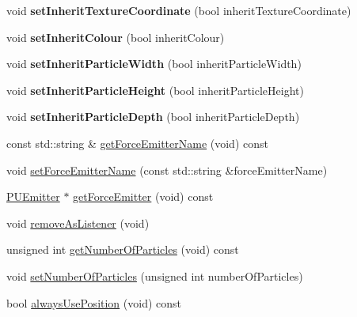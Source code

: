\begin{DoxyCompactItemize}
void {\bfseries set\+Inherit\+Texture\+Coordinate} (bool inherit\+Texture\+Coordinate)
\item 
\mbox{\label{classPUDoPlacementParticleEventHandler_a5a0e89b2e9f97be2961ca18541b1851e}} 
void {\bfseries set\+Inherit\+Colour} (bool inherit\+Colour)
\item 
\mbox{\label{classPUDoPlacementParticleEventHandler_a9ed7bb59f48aaf78fc12ee3a7077d3ee}} 
void {\bfseries set\+Inherit\+Particle\+Width} (bool inherit\+Particle\+Width)
\item 
\mbox{\label{classPUDoPlacementParticleEventHandler_a831eb45f0fd70ea5ec3fd5c255f9be76}} 
void {\bfseries set\+Inherit\+Particle\+Height} (bool inherit\+Particle\+Height)
\item 
\mbox{\label{classPUDoPlacementParticleEventHandler_adc98246958c411e27051834f67be777d}} 
void {\bfseries set\+Inherit\+Particle\+Depth} (bool inherit\+Particle\+Depth)
\item 
const std\+::string \& \hyperlink{classPUDoPlacementParticleEventHandler_ab56e12fe41572adc447449f72a87b774}{get\+Force\+Emitter\+Name} (void) const
\item 
void \hyperlink{classPUDoPlacementParticleEventHandler_a3f2f070e0ebaeb4f15f8f8f9bf4c8237}{set\+Force\+Emitter\+Name} (const std\+::string \&force\+Emitter\+Name)
\item 
\hyperlink{classPUEmitter}{P\+U\+Emitter} $\ast$ \hyperlink{classPUDoPlacementParticleEventHandler_a472cb20685ff513d1d599a339c933cde}{get\+Force\+Emitter} (void) const
\item 
void \hyperlink{classPUDoPlacementParticleEventHandler_a2d8d0acd323398efa7ff99f64a604c5f}{remove\+As\+Listener} (void)
\item 
unsigned int \hyperlink{classPUDoPlacementParticleEventHandler_a44a399cb47ba2149737eab0b65e45f1f}{get\+Number\+Of\+Particles} (void) const
\item 
void \hyperlink{classPUDoPlacementParticleEventHandler_a22b2de04e22c880c32049f2b32838369}{set\+Number\+Of\+Particles} (unsigned int number\+Of\+Particles)
\item 
bool \hyperlink{classPUDoPlacementParticleEventHandler_a95a5ae60fc370645d6aae741235f03f0}{always\+Use\+Position} (void) const

\end{DoxyCompactItemize}
